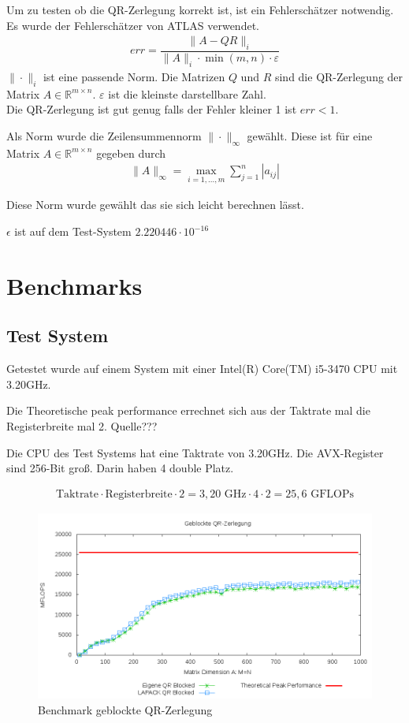 Um zu testen ob die QR-Zerlegung korrekt ist, ist ein Fehlerschätzer notwendig.
Es wurde der Fehlerschätzer von ATLAS\cite{atlas} verwendet.
\begin{align}
	err = \dfrac{\|A - QR\|_i}{\|A\|_i \cdot \min(m,n) \cdot \varepsilon}
\end{align}
$\|\cdot\|_i$ ist eine passende Norm.
Die Matrizen $Q$ und $R$ sind die QR-Zerlegung der Matrix $A \in \mathbb{R}^{m \times n}$.
$\varepsilon$ ist die kleinste darstellbare Zahl.\\
Die QR-Zerlegung ist gut genug falls der Fehler kleiner 1 ist $ err < 1 $.

Als Norm wurde die Zeilensummennorm $\|\cdot\|_\infty$ gewählt.
Diese ist für eine Matrix $A \in \mathbb{R}^{m\times n}$ gegeben durch
\begin{align*}
	\|A\|_\infty = \max_{i=1,...,m} \sum_{j=1}^{n} |a_{ij}|
\end{align*}

Diese Norm wurde gewählt das sie sich leicht berechnen lässt.

$\epsilon$ ist auf dem Test-System $2.220446\cdot10^{-16}$


\section{Benchmarks}

\subsection{Test System}

Getestet wurde auf einem System mit einer Intel(R) Core(TM) i5-3470 CPU mit 3.20GHz. 

Die Theoretische peak performance errechnet sich aus der Taktrate mal die Registerbreite mal 2. Quelle???


Die CPU des Test Systems hat eine Taktrate von 3.20GHz.
Die AVX-Register sind 256-Bit groß. Darin haben 4 double Platz.

\begin{align*}
	\text{Taktrate} \cdot \text{Registerbreite} \cdot 2= 3,20 \text{ GHz} \cdot 4 \cdot 2 = 25,6 \text{ GFLOPs}
\end{align*}

\begin{figure}[H]
	\includegraphics[width=\textwidth]{images/blk.png}
	\caption{Benchmark geblockte QR-Zerlegung}
	\label{img:blk}
\end{figure}

